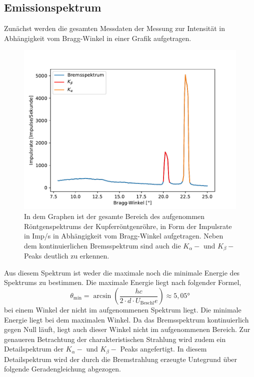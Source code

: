 \documentclass[titlepage = firstcover]{scrartcl}
\begin{document}
        \subsection{Emissionspektrum}
            Zunächst werden die gesamten Messdaten der Messung zur Intensität in Abhängigkeit vom Bragg-Winkel in einer Grafik aufgetragen.
            \FloatBarrier
            \begin{figure}[h]
              \centering
              \includegraphics{Spektrum_Cu.pdf}
              \caption{In dem Graphen ist der gesamte Bereich des aufgenommen Röntgenspektrums der Kupferröntgenröhre, in Form der Impulsrate in Imp/s in Abhängigkeit vom Bragg-Winkel aufgetragen. Neben dem kontinuierlichen Bremsspektrum sind auch die $K_{\alpha}-$ und $K_{\beta}-$ Peaks deutlich zu erkennen.}
              \label{fig:spektrum}
            \end{figure}
            \FloatBarrier
            \noindent
            Aus diesem Spektrum ist weder die maximale noch die minimale Energie des Spektrums zu bestimmen. Die maximale Energie liegt nach folgender Formel,
            \begin{equation*}
              \theta_{\text{min}} = \arcsin\left(\frac{hc}{2 \cdot d \cdot U_{\text{Beschl}}e} \right) \approx 5,05°
            \end{equation*}
            \noindent
            bei einem Winkel der nicht im aufgenommenen Spektrum liegt. Die minimale Energie liegt bei dem maximalen Winkel. Da das Bremsspektrum kontinuierlich gegen Null läuft, liegt auch dieser Winkel
            nicht im aufgenommenen Bereich.
            Zur genaueren Betrachtung der charakteristischen Strahlung wird zudem ein Detailspektrum der $K_{\alpha}-$ und $K_{\beta}-$ Peaks angefertigt. In diesem Detailspektrum wird der durch die 
            Bremstrahlung erzeugte Untegrund über folgende Geradengleichung abgezogen.
\end{document}
